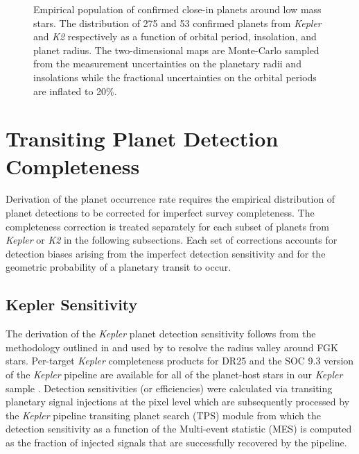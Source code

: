 \documentclass[twocolumn]{emulateapj}
\newcommand{\kepler}[1]{\emph{Kepler}#1}
\newcommand{\ktwo}[1]{\emph{K2}#1}
\begin{document}
\begin{figure}
  \centering
  \caption{Empirical population of confirmed close-in planets around low mass stars.
    The distribution of 275 and 53 confirmed planets from \kepler{}
    and \ktwo{} respectively as a function of orbital period, insolation, and planet radius. The two-dimensional maps are
    Monte-Carlo sampled from the measurement uncertainties on the planetary radii and insolations while 
    the fractional uncertainties on the orbital periods are inflated to
    20\%.} %
  \label{fig:Ndet}
\end{figure}





\section{Transiting Planet Detection Completeness}  \label{sect:completeness}
Derivation of the planet occurrence rate requires the empirical distribution of planet detections to be corrected
for imperfect survey completeness. The completeness correction is treated separately for each subset
of planets from \kepler{} or \ktwo{} in the following subsections. Each set of corrections accounts for detection
biases arising from the imperfect detection sensitivity and for the 
geometric probability of a planetary transit to occur.

\subsection{Kepler Sensitivity}
The derivation of the \kepler{} planet detection sensitivity follows from the methodology outlined in
\cite{christiansen16} and used by \cite{fulton17} to resolve the radius valley around FGK stars. Per-target
\kepler{} completeness products for DR25 and the SOC 9.3 version of the \kepler{} pipeline
\citep{jenkins10} are available
for all of the planet-host stars in our \kepler{} sample \citep{burke15,burke17}. Detection sensitivities
(or efficiencies) were calculated via transiting planetary signal injections at the pixel level
\citep{christiansen15,christiansen17} which are subsequently processed by the \kepler{} pipeline
transiting planet search (TPS) module from
which the detection sensitivity as a function of the Multi-event statistic (MES) is computed as the fraction of
injected signals that are successfully recovered by the pipeline.
\end{document}
